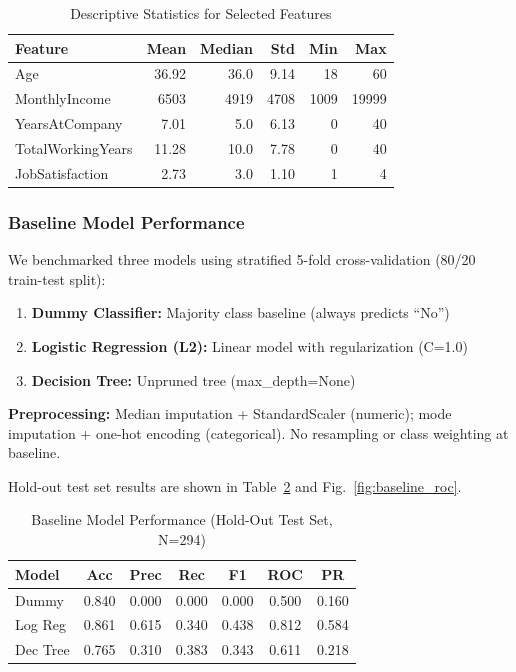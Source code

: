 \documentclass[conference]{IEEEtran}
\begin{document}
\begin{table}[!t]
\caption{Descriptive Statistics for Selected Features}
\label{tab:descriptive_stats}
\centering
\small
\begin{tabular}{lrrrrr}
\toprule
\textbf{Feature} & \textbf{Mean} & \textbf{Median} & \textbf{Std} & \textbf{Min} & \textbf{Max} \\
\midrule
Age & 36.92 & 36.0 & 9.14 & 18 & 60 \\
MonthlyIncome & 6503 & 4919 & 4708 & 1009 & 19999 \\
YearsAtCompany & 7.01 & 5.0 & 6.13 & 0 & 40 \\
TotalWorkingYears & 11.28 & 10.0 & 7.78 & 0 & 40 \\
JobSatisfaction & 2.73 & 3.0 & 1.10 & 1 & 4 \\
\bottomrule
\end{tabular}
\end{table}

\subsubsection{Baseline Model Performance}

We benchmarked three models using stratified 5-fold cross-validation (80/20 train-test split):

\begin{enumerate}
    \item \textbf{Dummy Classifier:} Majority class baseline (always predicts ``No'')
    \item \textbf{Logistic Regression (L2):} Linear model with regularization (C=1.0)
    \item \textbf{Decision Tree:} Unpruned tree (max\_depth=None)
\end{enumerate}

\textbf{Preprocessing:} Median imputation + StandardScaler (numeric); mode imputation + one-hot encoding (categorical). No resampling or class weighting at baseline.

Hold-out test set results are shown in Table~\ref{tab:baseline_metrics} and Fig.~\ref{fig:baseline_roc}.

\begin{table}[!t]
\caption{Baseline Model Performance (Hold-Out Test Set, N=294)}
\label{tab:baseline_metrics}
\centering
\small
\begin{tabular}{lcccccc}
\toprule
\textbf{Model} & \textbf{Acc} & \textbf{Prec} & \textbf{Rec} & \textbf{F1} & \textbf{ROC} & \textbf{PR} \\
\midrule
Dummy & 0.840 & 0.000 & 0.000 & 0.000 & 0.500 & 0.160 \\
Log Reg & 0.861 & 0.615 & 0.340 & 0.438 & 0.812 & 0.584 \\
Dec Tree & 0.765 & 0.310 & 0.383 & 0.343 & 0.611 & 0.218 \\
\bottomrule
\end{tabular}
\end{table}
\end{document}
